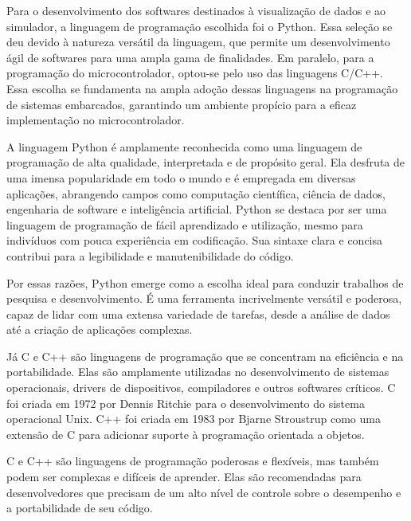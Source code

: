 Para o desenvolvimento dos softwares destinados à visualização de dados e ao simulador, a linguagem de programação escolhida foi o Python. Essa seleção se deu devido à natureza versátil da linguagem, que permite um desenvolvimento ágil de softwares para uma ampla gama de finalidades. Em paralelo, para a programação do microcontrolador, optou-se pelo uso das linguagens C/C++. Essa escolha se fundamenta na ampla adoção dessas linguagens na programação de sistemas embarcados, garantindo um ambiente propício para a eficaz implementação no microcontrolador.

A linguagem Python é amplamente reconhecida como uma linguagem de programação de alta qualidade, interpretada e de propósito geral. Ela desfruta de uma imensa popularidade em todo o mundo e é empregada em diversas aplicações, abrangendo campos como computação científica, ciência de dados, engenharia de software e inteligência artificial. Python se destaca por ser uma linguagem de programação de fácil aprendizado e utilização, mesmo para indivíduos com pouca experiência em codificação. Sua sintaxe clara e concisa contribui para a legibilidade e manutenibilidade do código.

Por essas razões, Python emerge como a escolha ideal para conduzir trabalhos de pesquisa e desenvolvimento. É uma ferramenta incrivelmente versátil e poderosa, capaz de lidar com uma extensa variedade de tarefas, desde a análise de dados até a criação de aplicações complexas.


Já C e C++ são linguagens de programação que se concentram na eficiência e na portabilidade. Elas são amplamente utilizadas no desenvolvimento de sistemas operacionais, drivers de dispositivos, compiladores e outros softwares críticos. C foi criada em 1972 por Dennis Ritchie para o desenvolvimento do sistema operacional Unix. C++ foi criada em 1983 por Bjarne Stroustrup como uma extensão de C para adicionar suporte à programação orientada a objetos.

C e C++ são linguagens de programação poderosas e flexíveis, mas também podem ser complexas e difíceis de aprender. Elas são recomendadas para desenvolvedores que precisam de um alto nível de controle sobre o desempenho e a portabilidade de seu código.